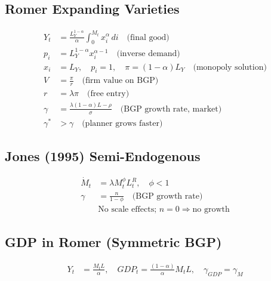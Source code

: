 \documentclass[a4paper,11pt]{article}
\begin{document}
\subsection*{Romer Expanding Varieties}
\begin{align*}
Y_t &= \frac{L_Y^{1-\alpha}}{\alpha}\int_0^{M_t} x_i^\alpha \, di \quad \text{(final good)} \\
p_i &= L_Y^{1-\alpha} x_i^{\alpha-1} \quad \text{(inverse demand)} \\
x_i &= L_Y, \quad p_i = 1, \quad \pi = (1-\alpha)L_Y \quad \text{(monopoly solution)} \\
V &= \frac{\pi}{r} \quad \text{(firm value on BGP)} \\
r &= \lambda \pi \quad \text{(free entry)} \\
\gamma &= \frac{\lambda(1-\alpha)L - \rho}{\sigma} \quad \text{(BGP growth rate, market)} \\
\gamma^* &> \gamma \quad \text{(planner grows faster)}
\end{align*}

\subsection*{Jones (1995) Semi-Endogenous}
\begin{align*}
\dot{M}_t &= \lambda M_t^\phi L_t^R, \quad \phi < 1 \\
\gamma &= \frac{n}{1-\phi} \quad \text{(BGP growth rate)} \\
&\text{No scale effects; } n = 0 \Rightarrow \text{no growth}
\end{align*}

\subsection*{GDP in Romer (Symmetric BGP)}
\begin{align*}
Y_t &= \frac{M_t L}{\alpha}, \quad GDP_t = \frac{(1-\alpha)}{\alpha} M_t L, \quad \gamma_{GDP} = \gamma_M
\end{align*}
\end{document}
